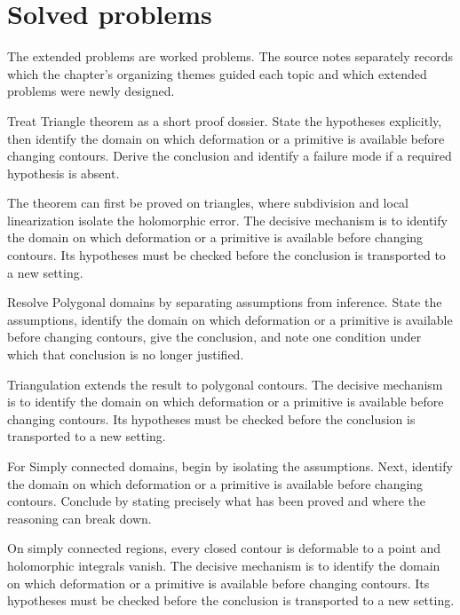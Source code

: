 \section{Solved problems}
The extended problems are worked problems. The source notes separately records which the chapter's organizing themes guided each topic and which extended problems were newly designed.

\begin{problem}\label{prob:iv05-problem-01}
Treat Triangle theorem as a short proof dossier. State the hypotheses explicitly, then identify the domain on which deformation or a primitive is available before changing contours. Derive the conclusion and identify a failure mode if a required hypothesis is absent.
\end{problem}
\begin{solution}
The theorem can first be proved on triangles, where subdivision and local linearization isolate the holomorphic error. The decisive mechanism is to identify the domain on which deformation or a primitive is available before changing contours. Its hypotheses must be checked before the conclusion is transported to a new setting.
\end{solution}

\begin{problem}\label{prob:iv05-problem-02}
Resolve Polygonal domains by separating assumptions from inference. State the assumptions, identify the domain on which deformation or a primitive is available before changing contours, give the conclusion, and note one condition under which that conclusion is no longer justified.
\end{problem}
\begin{solution}
Triangulation extends the result to polygonal contours. The decisive mechanism is to identify the domain on which deformation or a primitive is available before changing contours. Its hypotheses must be checked before the conclusion is transported to a new setting.
\end{solution}

\begin{problem}\label{prob:iv05-problem-03}
For Simply connected domains, begin by isolating the assumptions. Next, identify the domain on which deformation or a primitive is available before changing contours. Conclude by stating precisely what has been proved and where the reasoning can break down.
\end{problem}
\begin{solution}
On simply connected regions, every closed contour is deformable to a point and holomorphic integrals vanish. The decisive mechanism is to identify the domain on which deformation or a primitive is available before changing contours. Its hypotheses must be checked before the conclusion is transported to a new setting.
\end{solution}

